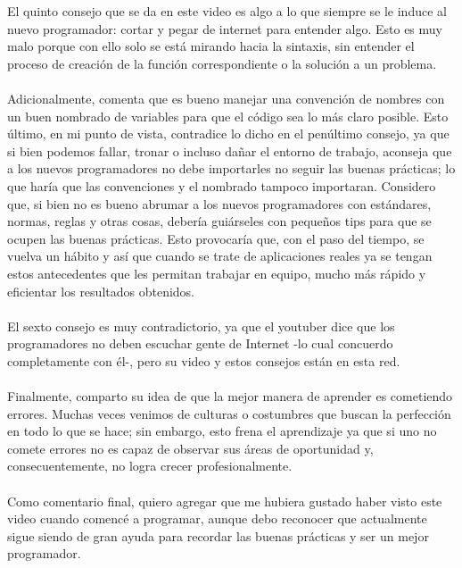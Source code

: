 \documentclass[letterpaper,12pt]{article} %
\begin{document}
	El quinto consejo que se da en este video es algo a lo que siempre se le induce al nuevo programador: cortar y pegar de internet para entender algo. Esto es muy malo porque con ello solo se está mirando hacia la sintaxis, sin entender el proceso de creación de la función correspondiente o la solución a un problema. \\ \\
	Adicionalmente, comenta que es bueno manejar una convención de nombres con un buen nombrado de variables para que el código sea lo más claro posible. Esto último, en mi punto de vista, contradice lo dicho en el penúltimo consejo, ya que si bien podemos fallar, tronar o incluso dañar el entorno de trabajo, aconseja que a los nuevos programadores no debe importarles no seguir las buenas prácticas; lo que haría que las convenciones y el nombrado tampoco importaran. Considero que, si bien no es bueno abrumar a los nuevos programadores con estándares, normas, reglas y otras cosas, debería guiárseles con pequeños tips para que se ocupen las buenas prácticas. Esto provocaría que, con el paso del tiempo, se vuelva un hábito y así que cuando se trate de aplicaciones reales ya se tengan estos antecedentes que les permitan trabajar en equipo, mucho más rápido y eficientar los resultados obtenidos. \\ \\
	El sexto consejo es muy contradictorio, ya que el youtuber dice que los programadores no deben escuchar gente de Internet -lo cual concuerdo completamente con él-, pero su video y estos consejos están en esta red. \\ \\
	Finalmente, comparto su idea de que la mejor manera de aprender es cometiendo errores. Muchas veces venimos de culturas o costumbres que buscan la perfección en todo lo que se hace; sin embargo, esto frena el aprendizaje ya que si uno no comete errores no es capaz de observar sus áreas de oportunidad y, consecuentemente, no logra crecer profesionalmente. \\ \\
	Como comentario final, quiero agregar que me hubiera gustado haber visto este video cuando comencé a programar, aunque debo reconocer que actualmente sigue siendo de gran ayuda para recordar las buenas prácticas y ser un mejor programador.
\end{document}
